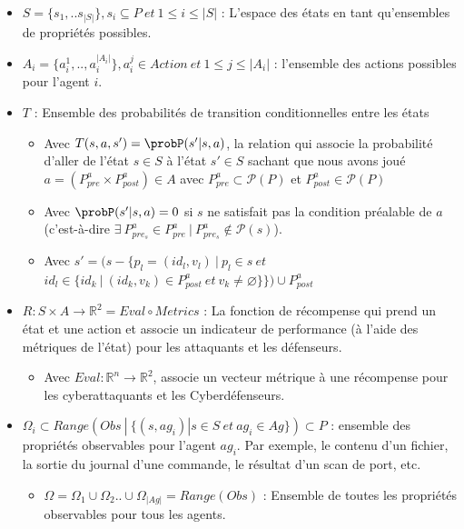 \begin{itemize}
  \item $S = \{s_1, ..s_{|S|}\}, s_{i} \subseteq P \: et \: 1 \le i \le |S|$ : L'espace des états en tant qu'ensembles de propriétés possibles.

  \item $A_{i} = \{a_{i}^{1},..,a_{i}^{|A_{i}|}\}, a_{i}^j \in Action \: et \: 1 \le j \le |A_i|$ : l'ensemble des actions possibles pour l'agent $i$.

  \item $T$ : Ensemble des probabilités de transition conditionnelles entre les états
        \begin{itemize}
          \item Avec $T(s,a,s') = \probP(s'|s,a)$, la relation qui associe la probabilité d'aller de l'état $s \in S$ à l'état $s' \in S$ sachant que nous avons joué $a = (P^a_{pre} \times P^a_{post}) \in A$ avec $P^a_{pre} \subset \mathcal{P}(P)$ et $P^a_{post} \in \mathcal{P}(P)$
          \item Avec $\probP(s'|s,a) = 0$ si $s$ ne satisfait pas la condition préalable de $a$ (c'est-à-dire $\exists \: P_{pre_s}^{a} \in P_{pre}^{a} \: | \: P_{pre_s}^{a} \not\in \mathcal{P}(s)$).
          \item Avec $s' = (s - \{p_l=(id_l, v_l) \: | \: p_l \in s \: et$ $id_l \in \{id_k \: | \: (id_k, v_k) \in P^a_{post} \: et \: v_k \neq \varnothing\}\}) \cup P^a_{post}$
        \end{itemize}



  \item $R : S \times A \rightarrow \mathbb{R}^2 = Eval \circ Metrics$ : La fonction de récompense qui prend un état et une action et associe un indicateur de performance (à l'aide des métriques de l'état) pour les attaquants et les défenseurs.
        \begin{itemize}
          \item Avec $Eval : \mathbb{R}^{n} \rightarrow \mathbb{R}^2$, associe un vecteur métrique à une récompense pour les cyberattaquants et les Cyberdéfenseurs.
        \end{itemize}



  \item $\Omega_{i} \subset Range(Obs \: | \: \{ (s, ag_i) | s \in S \: et \: ag_i \in Ag \}) \subset P$ : ensemble des propriétés observables pour l'agent $ag_i$. Par exemple, le contenu d'un fichier, la sortie du journal d'une commande, le résultat d'un scan de port, etc.
        \begin{itemize}
          \item $\Omega = \Omega_1 \cup \Omega_2 .. \cup \Omega_{|Ag|} = Range(Obs)$ : Ensemble de toutes les propriétés observables pour tous les agents.
        \end{itemize}


\end{itemize}
